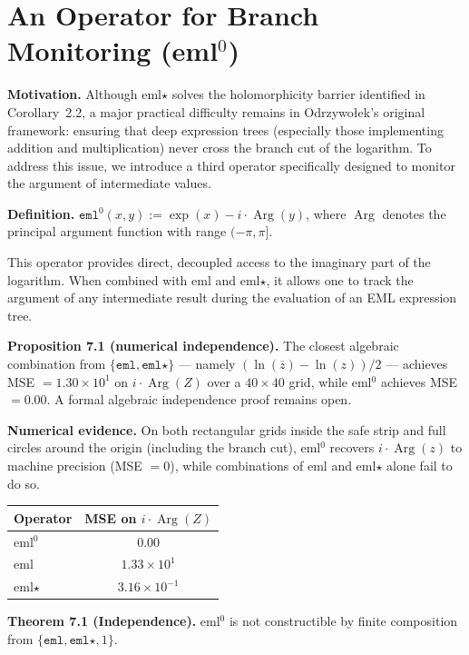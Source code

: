 \documentclass[11pt,a4paper]{article}
\begin{document}
\section{An Operator for Branch Monitoring (eml$^0$)}

\textbf{Motivation.} Although eml$\star$ solves the holomorphicity barrier identified in Corollary~2.2, a major practical difficulty remains in Odrzywołek's original framework: ensuring that deep expression trees (especially those implementing addition and multiplication) never cross the branch cut of the logarithm. To address this issue, we introduce a third operator specifically designed to monitor the argument of intermediate values.

\textbf{Definition.} $\texttt{eml}^0(x, y) := \exp(x) - i \cdot \operatorname{Arg}(y)$, where $\operatorname{Arg}$ denotes the principal argument function with range $(-\pi, \pi]$.

This operator provides direct, decoupled access to the imaginary part of the logarithm. When combined with eml and eml$\star$, it allows one to track the argument of any intermediate result during the evaluation of an EML expression tree.

\textbf{Proposition 7.1 (numerical independence).} The closest algebraic combination from $\{\texttt{eml}, \texttt{eml}\star\}$ --- namely $(\ln(\overline{z}) - \ln(z))/2$ --- achieves MSE $= 1.30 \times 10^{1}$ on $i \cdot \operatorname{Arg}(Z)$ over a $40 \times 40$ grid, while eml$^0$ achieves MSE $= 0.00$. A formal algebraic independence proof remains open.

\textbf{Numerical evidence.} On both rectangular grids inside the safe strip and full circles around the origin (including the branch cut), eml$^0$ recovers $i \cdot \operatorname{Arg}(z)$ to machine precision (MSE $= 0$), while combinations of eml and eml$\star$ alone fail to do so.

\begin{table}[h]
\centering
\begin{tabular}{lc}
\toprule
Operator & MSE on $i \cdot \operatorname{Arg}(Z)$ \\
\midrule
eml$^0$ & $0.00$ \\
eml & $1.33 \times 10^{1}$ \\
eml$\star$ & $3.16 \times 10^{-1}$ \\
\bottomrule
\end{tabular}
\end{table}

\textbf{Theorem 7.1 (Independence).} eml$^0$ is not constructible by finite composition from $\{\texttt{eml}, \texttt{eml}\star, 1\}$.
\end{document}
